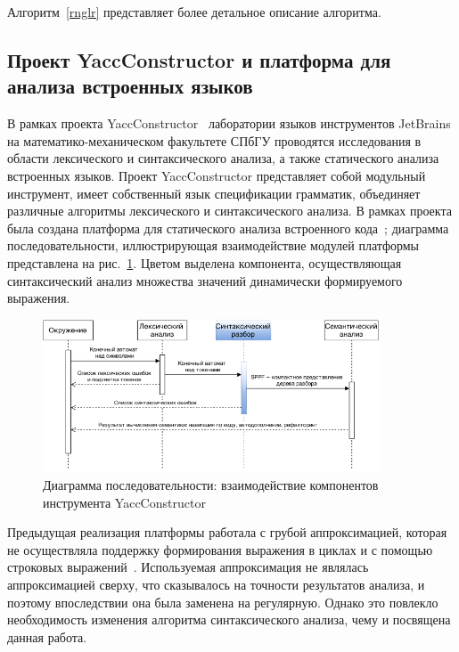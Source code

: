 Алгоритм~\ref{rnglr} представляет более детальное описание алгоритма.

\subsection{Проект YaccConstructor и платформа для анализа встроенных языков}
В рамках проекта YaccConstructor~\cite{YC} лаборатории языков инструментов JetBrains на математико-механическом факультете СПбГУ проводятся исследования в области лексического и синтаксического анализа, а также статического анализа встроенных языков. Проект YaccConstructor представляет собой модульный инструмент, имеет собственный язык спецификации грамматик, объединяет различные алгоритмы лексического и синтаксического анализа. В рамках проекта была создана платформа для статического анализа встроенного кода~\cite{SECR14}; диаграмма последовательности, иллюстрирующая взаимодействие модулей платформы представлена на рис.~\ref{seq}. Цветом выделена компонента, осуществляющая синтаксический анализ множества значений динамически формируемого выражения. 
\begin{figure}[!h]
 \centering
 \includegraphics[width=10cm]{Verbitskaya/pics/Seq_rus.png}
 \caption{Диаграмма последовательности: взаимодействие компонентов
инструмента YaccConstructor}
 \label{seq}
\end{figure}

Предыдущая реализация платформы работала с грубой аппроксимацией, которая не осуществляла поддержку формирования выражения в циклах и с помощью строковых выражений~\cite{SECR13}. Используемая аппроксимация не являлась аппроксимацией сверху, что сказывалось на точности результатов анализа, и поэтому впоследствии она была заменена на регулярную. Однако это повлекло необходимость изменения алгоритма синтаксического анализа, чему и посвящена данная работа. 
